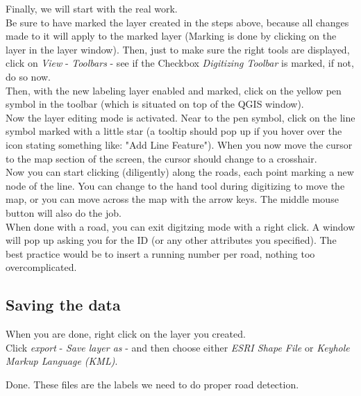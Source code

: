 \documentclass[12pt,a4paper]{scrartcl}
\begin{document}
Finally, we will start with the real work. \\

Be sure to have marked the layer created in the steps above, because all changes made to it will apply to the marked layer (Marking is done by clicking on the layer in the layer window).
Then, just to make sure the right tools are displayed, click on \textit{View} - \textit{Toolbars} - see if the Checkbox \textit{Digitizing Toolbar} is marked, if not, do so now. \\

Then, with the new labeling layer enabled and marked, click on the yellow pen symbol in the toolbar (which is situated on top of the QGIS window). \\
Now the layer editing mode is activated.
Near to the pen symbol, click on the line symbol marked with a little star (a tooltip should pop up if you hover over the icon stating something like: "Add Line Feature").  
When you now move the cursor to the map section of the screen, the cursor should change to a crosshair. \\

Now you can start clicking (diligently) along the roads, each point marking a new node of the line.
You can change to the hand tool during digitizing to move the map, or you can move across the map with the arrow keys. The middle mouse button will also do the job. \\

When done with a road, you can exit digitzing mode with a right click.
A window will pop up asking you for the ID (or any other attributes you specified).
The best practice would be to insert a running number per road, nothing too overcomplicated. 

\subsection{Saving the data}

When you are done, right click on the layer you created. \\
Click  \textit{export} - \textit{Save layer as} - and then choose either \textit{ESRI Shape File} or \textit{Keyhole Markup Language (KML)}.

Done. These files are the labels we need to do proper road detection.








\end{document}
